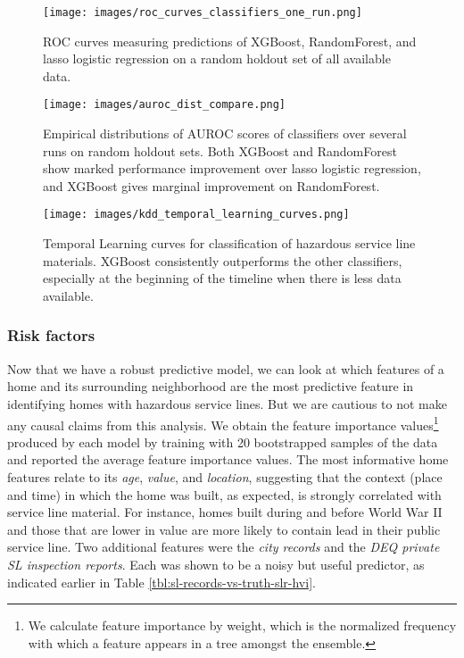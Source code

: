 \documentclass[sigconf]{acmart}
\begin{document}
\begin{figure}[!ht]
\centering
\texttt{[image: images/roc\_curves\_classifiers\_one\_run.png]}
\caption{ROC curves measuring predictions of XGBoost, RandomForest, and lasso logistic regression on a random holdout set of all available data.}
\label{fig:roc_curve_one_run}
\end{figure}

\begin{figure}[!ht]
\centering
\texttt{[image: images/auroc\_dist\_compare.png]}
	\caption{Empirical distributions of AUROC scores of classifiers over several runs on random holdout sets.  Both XGBoost and RandomForest show marked performance improvement over lasso logistic regression, and XGBoost gives marginal improvement on RandomForest.} \label{fig:roc_scores_classifiers}
\end{figure}


\begin{figure}[!t]
\centering
 \texttt{[image: images/kdd\_temporal\_learning\_curves.png]} 
	\caption{Temporal Learning curves for classification of hazardous service line materials. XGBoost consistently outperforms the other classifiers, especially at the beginning of the timeline when there is less data available.}
	\label{fig:learn_curve}
\end{figure}



\subsubsection{Risk factors}

Now that we have a robust predictive model, we can look at which features of a home and its surrounding neighborhood are the most predictive feature in identifying homes with hazardous service lines. But we are cautious to not make any causal claims from this analysis. We obtain the feature importance values\footnote{We calculate feature importance by weight, which is the normalized frequency with which a feature appears in a tree amongst the ensemble.} produced by each model by training with 20 bootstrapped samples of the data and reported the average feature importance values. The most informative home features relate to its \emph{age}, \emph{value}, and \emph{location}, suggesting that the context (place and time) in which the home was built, as expected, is strongly correlated with service line material. For instance, homes built during and before World War II and those that are lower in value are more likely to contain lead in their public service line. Two additional features were the \emph{city records} and the \emph{DEQ private SL inspection reports}. Each was shown to be a noisy but useful predictor, as indicated earlier in Table \ref{tbl:sl-records-vs-truth-slr-hvi}.  
\end{document}
